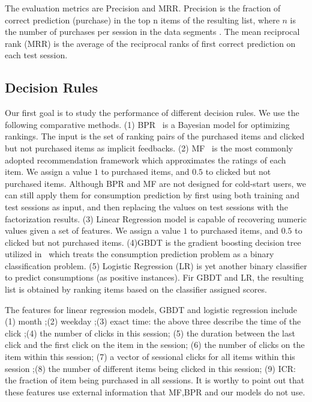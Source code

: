 \documentclass[sigconf]{acmart}
\begin{document}
The evaluation metrics are Precision and MRR. Precision is the fraction of correct prediction (purchase) in the top n items of the resulting list, where $n$ is the number of purchases per session in the data segments . The mean reciprocal rank (MRR) is the average of the reciprocal ranks of first correct prediction on each test session.

\subsection{Decision Rules}
Our first goal is to study the performance of different decision rules. We use the following comparative methods. (1) BPR~\cite{Rendle2009BPR} is a Bayesian model for optimizing rankings. The input is the set of ranking pairs of the purchased items  and clicked but not purchased items as implicit feedbacks. (2) MF~\cite{Koren2009Matrix} is the most commonly adopted recommendation framework which approximates the ratings of each item. We assign a value $1$ to purchased items, and $0.5$ to clicked but not purchased items. Although BPR and MF are not designed for cold-start users, we can still apply them for consumption prediction by first using both training and test sessions as input, and then replacing the values on test sessions with the factorization results. (3) Linear Regression model is capable of recovering numeric values given a set of features. We assign a value $1$ to purchased items, and $0.5$ to clicked but not purchased items. (4)GBDT is the  gradient boosting decision tree utilized in~\cite{Yan2015E} which treats the consumption prediction problem as a binary classification problem. (5) Logistic Regression (LR) is yet another binary classifier to predict consumptions (as positive instances). Fir GBDT and LR, the resulting list is obtained by ranking items based on the classifier assigned scores. 

The features for linear regression models, GBDT and logistic regression include (1) month ;(2) weekday ;(3) exact time: the above three describe the time of the click ;(4) the number of clicks in this session; (5) the duration between the last click and the first click on the item in the session; (6) the number of clicks on the item within this session; (7) a vector of sessional clicks for all items within this session ;(8) the number of different items being clicked in this session; (9) ICR: the fraction of item being purchased in all sessions. It is worthy to point out that these features use external information that MF,BPR and our models do not use.
\end{document}
